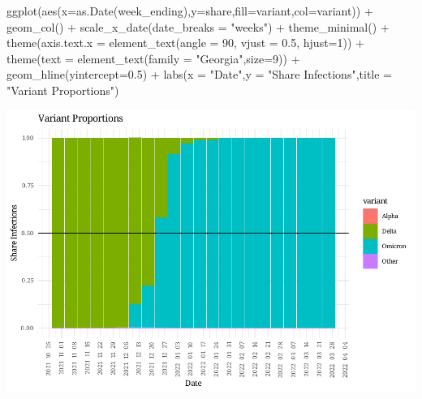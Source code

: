 \documentclass[
]{article}
\newenvironment{Shaded}{\begin{snugshade}}{\end{snugshade}}
\newcommand{\AttributeTok}[1]{\textcolor[rgb]{0.77,0.63,0.00}{#1}}
\newcommand{\DecValTok}[1]{\textcolor[rgb]{0.00,0.00,0.81}{#1}}
\newcommand{\FloatTok}[1]{\textcolor[rgb]{0.00,0.00,0.81}{#1}}
\newcommand{\FunctionTok}[1]{\textcolor[rgb]{0.00,0.00,0.00}{#1}}
\newcommand{\NormalTok}[1]{#1}
\newcommand{\SpecialCharTok}[1]{\textcolor[rgb]{0.00,0.00,0.00}{#1}}
\newcommand{\StringTok}[1]{\textcolor[rgb]{0.31,0.60,0.02}{#1}}
\begin{document}
\begin{Shaded}
\begin{Highlighting}[]
  \FunctionTok{ggplot}\NormalTok{(}\FunctionTok{aes}\NormalTok{(}\AttributeTok{x=}\FunctionTok{as.Date}\NormalTok{(week\_ending),}\AttributeTok{y=}\NormalTok{share,}\AttributeTok{fill=}\NormalTok{variant,}\AttributeTok{col=}\NormalTok{variant)) }\SpecialCharTok{+} 
  \FunctionTok{geom\_col}\NormalTok{() }\SpecialCharTok{+}
  \FunctionTok{scale\_x\_date}\NormalTok{(}\AttributeTok{date\_breaks =} \StringTok{"weeks"}\NormalTok{) }\SpecialCharTok{+}
  \FunctionTok{theme\_minimal}\NormalTok{() }\SpecialCharTok{+} 
  \FunctionTok{theme}\NormalTok{(}\AttributeTok{axis.text.x =} \FunctionTok{element\_text}\NormalTok{(}\AttributeTok{angle =} \DecValTok{90}\NormalTok{, }\AttributeTok{vjust =} \FloatTok{0.5}\NormalTok{, }\AttributeTok{hjust=}\DecValTok{1}\NormalTok{)) }\SpecialCharTok{+}
  \FunctionTok{theme}\NormalTok{(}\AttributeTok{text =} \FunctionTok{element\_text}\NormalTok{(}\AttributeTok{family =} \StringTok{"Georgia"}\NormalTok{,}\AttributeTok{size=}\DecValTok{9}\NormalTok{)) }\SpecialCharTok{+}
  \FunctionTok{geom\_hline}\NormalTok{(}\AttributeTok{yintercept=}\FloatTok{0.5}\NormalTok{) }\SpecialCharTok{+} 
  \FunctionTok{labs}\NormalTok{(}\AttributeTok{x =} \StringTok{"Date"}\NormalTok{,}\AttributeTok{y =} \StringTok{"Share Infections"}\NormalTok{,}\AttributeTok{title =} \StringTok{"Variant Proportions"}\NormalTok{)}
\end{Highlighting}
\end{Shaded}

\includegraphics{risk_of_infection_files/figure-latex/unnamed-chunk-2-1.pdf}
\end{document}
